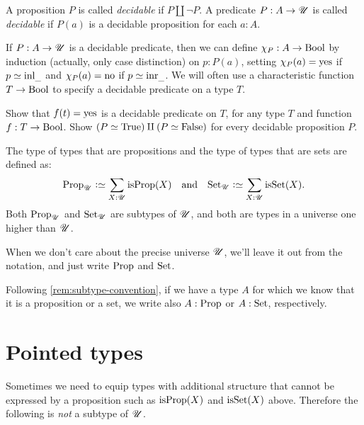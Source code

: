 \begin{definition}\label{def:decidability}
A proposition $P$ is called \emph{decidable} if $P\amalg\neg P$.
A predicate $P: A\to{\mathscr{U}}$ is called \emph{decidable} if 
$P(a)$ is a decidable proposition for each $a:A$.
\end{definition}

If $P: A\to{\mathscr{U}}$ is a decidable predicate, then
we can define $\chi_P: A\to\mathrm{Bool}$ by induction (actually,
only case distinction) on $p:P(a)$, setting $\chi_P(a)=\mathrm{yes}$
if $p\jdeq\inl{\_}$ and $\chi_P(a)=\mathrm{no}$ if $p\jdeq\inr{\_}$.
We will often use a characteristic function $T\to\mathrm{Bool}$ to
specify a decidable predicate on a type $T$.

\begin{xca}\label{xca:decidability}
Show that $f(t)=\mathrm{yes}$ is a decidable predicate on $T$,
for any type $T$ and function $f:T\to\mathrm{Bool}$.
Show $(P\simeq\mathrm{True})\amalg(P\simeq\mathrm{False})$ for every decidable
proposition $P$. 
\end{xca}

\begin{definition}\label{def:Prop-Set}
The type of types that are propositions and the 
type of types that are sets are defined as:
\[\Prop_\UU\defeq \sum_{X:\UU}\isprop(X)\quad
\text{and}\quad\Set_\UU\defeq \sum_{X:\UU}\isset(X).\]
Both $\mathrm{Prop}_{\mathscr{U}}$ and $\mathrm{Set}_{\mathscr{U}}$ are subtypes of ${\mathscr{U}}$, and
both are types in a universe one higher than ${\mathscr{U}}$. 
\end{definition}
When we don't care about the precise universe ${\mathscr{U}}$,
we'll leave it out from the notation,
and just write $\mathrm{Prop}$ and $\mathrm{Set}$.

Following \cref{rem:subtype-convention},
if we have a type $A$ for which we know that it is a proposition or a set,
we write also $A : \mathrm{Prop}$ or $A : \mathrm{Set}$, respectively.

\section{Pointed types}\label{sec:pointedtypes}
Sometimes we need to equip types with additional structure
that cannot be expressed by a proposition such as
$\isprop(X)$ and $\isset(X)$ above.
Therefore the following is \emph{not} a subtype of ${\mathscr{U}}$.

